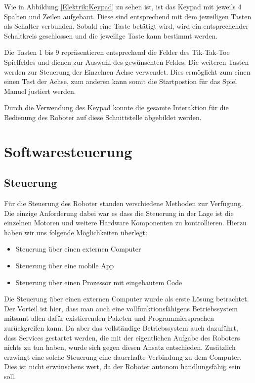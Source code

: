 \documentclass[conference,compsoc,final,a4paper]{IEEEtran}
\begin{document}
Wie in Abbildung \ref{Elektrik:Keypad} zu sehen ist, ist das Keypad mit jeweils 4 Spalten und Zeilen aufgebaut. Diese sind entsprechend mit dem jeweiligen Tasten als Schalter verbunden. 
Sobald eine Taste betätigt wird, wird ein entsprechender Schaltkreis geschlossen und die jeweilige Taste kann bestimmt werden.

Die Tasten 1 bis 9 repräsentieren entsprechend die Felder des Tik-Tak-Toe Spielfeldes und dienen zur Auswahl des gewünschten Feldes. 
Die weiteren Tasten werden zur Steuerung der Einzelnen Achse verwendet.
Dies ermöglicht zum einen einen Test der Achse, zum anderen kann somit die Startpostion für das Spiel Manuel justiert werden.

Durch die Verwendung des Keypad konnte die gesamte Interaktion für die Bedienung des Roboter auf diese Schnittstelle abgebildet werden.

\section{Softwaresteuerung}

\subsection{Steuerung}
Für die Steuerung des Roboter standen verschiedene Methoden zur Verfügung. Die einzige Anforderung dabei
war es dass die Steuerung in der Lage ist die einzelnen Motoren und weitere Hardware Komponenten
zu kontrollieren. Hierzu haben wir uns folgende Möglichkeiten überlegt:

\begin{itemize}
  \item Steuerung über einen externen Computer
  \item Steuerung über eine mobile App
  \item Steuerung über einen Prozessor mit eingebautem Code
\end{itemize}

Die Steuerung über einen externen Computer wurde als erste Lösung betrachtet. Der Vorteil
ist hier, dass man auch eine vollfunktionsfähigens Betriebssystem mitsamt allen dafür existierenden
Paketen und Programmiersprachen zurückgreifen kann. Da aber das vollständige Betriebssystem auch
dazuführt, dass Services gestartet werden, die mit der eigentlichen Aufgabe des Roboters nichts zu
tun haben, wurde sich gegen diesen Ansatz entschieden. Zusätzlich erzwingt eine solche Steuerung
eine dauerhafte Verbindung zu dem Computer. Dies ist nicht erwünschens wert, da der Roboter autonom
handlungsfähig sein soll.
\end{document}
